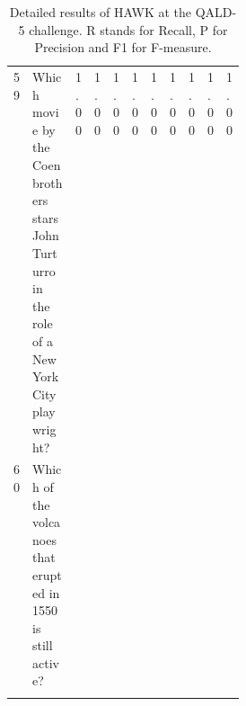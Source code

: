 \begin{longtable}{@{}lp{0.3\linewidth}lllllllll@{}}
59       & Which movie by the Coen brothers stars John Turturro in the role of a New York City playwright?             & 1.00                        & 1.00                         & 1.00                         & 1.00                      & 1.00                      & 1.00                      & 1.00                     & 1.00                     & 1.00                     \\
60       & Which of the volcanoes that erupted in 1550 is still active?                                                & \cellcolor[HTML]{BBDAFF}    & \cellcolor[HTML]{BBDAFF}     & \cellcolor[HTML]{BBDAFF}     & \cellcolor[HTML]{BBDAFF}  & \cellcolor[HTML]{BBDAFF}  & \cellcolor[HTML]{BBDAFF}  & \cellcolor[HTML]{BBDAFF} & \cellcolor[HTML]{BBDAFF} & \cellcolor[HTML]{BBDAFF} \\ \bottomrule


\caption{Detailed results of HAWK at the QALD-5 challenge. R stands for Recall, P for Precision and F1 for F-measure.}
\label{tab:eval_qal5_detail}
\end{longtable}